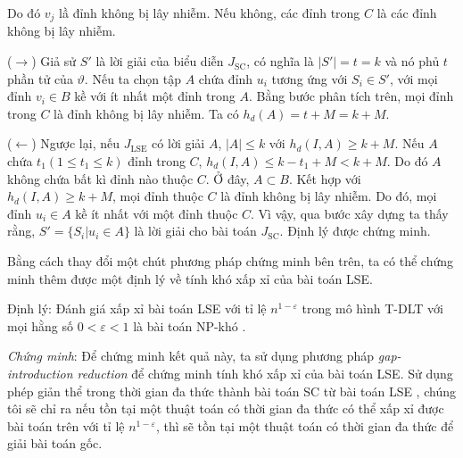  	Do đó $v_{j}$ lầ đỉnh không bị lây nhiễm. Nếu không, các đỉnh trong $C$ là các đỉnh không bị lây nhiễm.
 	
 	($\rightarrow$) Giả sử $S'$ là lời giải của biểu diễn $J_{\text{SC}}$, có nghĩa là $| S' | = t = k$ và nó phủ $t$ phần tử của $\vartheta$. Nếu ta chọn tập $A$ chứa đỉnh $u_{i}$ tương ứng với $S_{i} \in S'$, với mọi đỉnh $v_{i} \in B$ kề với ít nhất một đỉnh trong $A$. Bằng bước phân tích trên, mọi đỉnh trong $C$ là đỉnh không bị lây nhiễm. Ta có $h_{d}(A) = t + M = k + M$.
 	
 	($\leftarrow$) Ngược lại, nếu $J_{\text{LSE}}$ có lời giải $A$, $|A| \leq k$ với $h_{d}(I, A) \geq k + M$. Nếu $A$ chứa $t_{1} (1 \leq t_{1} \leq k)$ đỉnh trong $C$, $h_{d}(I, A) \leq k - t_{1} + M < k + M$. Do đó $A$ không chứa bất kì đỉnh nào thuộc $C$. Ở đây, $A \subset B$. Kết hợp với $h_{d}(I, A) \geq k + M$, mọi đỉnh thuộc $C$ là đỉnh không bị lây nhiễm. Do đó, mọi đỉnh $u_{i} \in A$ kề ít nhất với một đỉnh thuộc $C$. Vì vậy, qua bước xây dựng ta thấy rằng, $S' = \{ S_{i} | u_{i} \in A \}$ là lời giải cho bài toán $J_{\text{SC}}$. Định lý được chứng minh.
 	
 	Bằng cách thay đổi một chút phương pháp chứng minh bên trên, ta có thể chứng minh thêm được một định lý về tính khó xấp xỉ của bài toán LSE.
 	
 	Định lý: Đánh giá xấp xỉ bài toán LSE với tỉ lệ $n^{1 - \varepsilon}$ trong mô hình T-DLT với mọi hằng số $0 < \varepsilon < 1$ là bài toán NP-khó .
 	
 	{\itshape Chứng minh}: Để chứng minh kết quả này, ta sử dụng phương pháp {\itshape gap-introduction reduction} \cite{vijay38} để chứng minh tính khó xấp xỉ của bài toán LSE. Sử dụng phép giản thể trong thời gian đa thức thành bài toán SC từ bài toán LSE , chúng tôi sẽ chỉ ra nếu tồn tại một thuật toán có thời gian đa thức có thể xấp xỉ được bài toán trên với tỉ lệ $n^{1 - \varepsilon}$, thì sẽ tồn tại một thuật toán có thời gian đa thức để giải bài toán gốc.
 	

